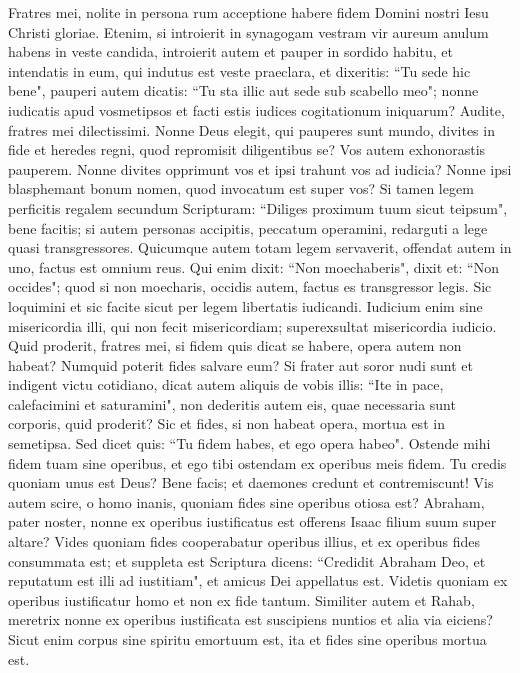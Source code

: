 \begin{biblechapter} 
\verse Fratres mei, nolite in persona rum acceptione habere fidem Domini nostri Iesu Christi gloriae. 
\verse Etenim, si introierit in synagogam vestram vir aureum anulum habens in veste candida, introierit autem et pauper in sordido habitu, 
\verse et intendatis in eum, qui indutus est veste praeclara, et dixeritis: “Tu sede hic bene", pauperi autem dicatis: “Tu sta illic aut sede sub scabello meo"; 
\verse nonne iudicatis apud vosmetipsos et facti estis iudices cogitationum iniquarum? 
\verse Audite, fratres mei dilectissimi. Nonne Deus elegit, qui pauperes sunt mundo, divites in fide et heredes regni, quod repromisit diligentibus se? 
\verse Vos autem exhonorastis pauperem. Nonne divites opprimunt vos et ipsi trahunt vos ad iudicia? 
\verse Nonne ipsi blasphemant bonum nomen, quod invocatum est super vos?  
\verse Si tamen legem perficitis regalem secundum Scripturam: “Diliges proximum tuum sicut teipsum", bene facitis; 
\verse si autem personas accipitis, peccatum operamini, redarguti a lege quasi transgressores. 
\verse Quicumque autem totam legem servaverit, offendat autem in uno, factus est omnium reus. 
\verse Qui enim dixit: “Non moechaberis", dixit et: “Non occides"; quod si non moecharis, occidis autem, factus es transgressor legis. 
\verse Sic loquimini et sic facite sicut per legem libertatis iudicandi. 
\verse Iudicium enim sine misericordia illi, qui non fecit misericordiam; superexsultat misericordia iudicio. 
\verse Quid proderit, fratres mei, si fidem quis dicat se habere, opera autem non habeat? Numquid poterit fides salvare eum? 
\verse Si frater aut soror nudi sunt et indigent victu cotidiano, 
\verse dicat autem aliquis de vobis illis: “Ite in pace, calefacimini et saturamini", non dederitis autem eis, quae necessaria sunt corporis, quid proderit? 
\verse Sic et fides, si non habeat opera, mortua est in semetipsa. 
\verse Sed dicet quis: “Tu fidem habes, et ego opera habeo". Ostende mihi fidem tuam sine operibus, et ego tibi ostendam ex operibus meis fidem. 
\verse Tu credis quoniam unus est Deus? Bene facis; et daemones credunt et contremiscunt! 
\verse Vis autem scire, o homo inanis, quoniam fides sine operibus otiosa est? 
\verse Abraham, pater noster, nonne ex operibus iustificatus est offerens Isaac filium suum super altare? 
\verse Vides quoniam fides cooperabatur operibus illius, et ex operibus fides consummata est; 
\verse et suppleta est Scriptura dicens: “Credidit Abraham Deo, et reputatum est illi ad iustitiam", et amicus Dei appellatus est. 
\verse Videtis quoniam ex operibus iustificatur homo et non ex fide tantum. 
\verse Similiter autem et Rahab, meretrix nonne ex operibus iustificata est suscipiens nuntios et alia via eiciens? 
\verse Sicut enim corpus sine spiritu emortuum est, ita et fides sine operibus mortua est. 
\end{biblechapter}

